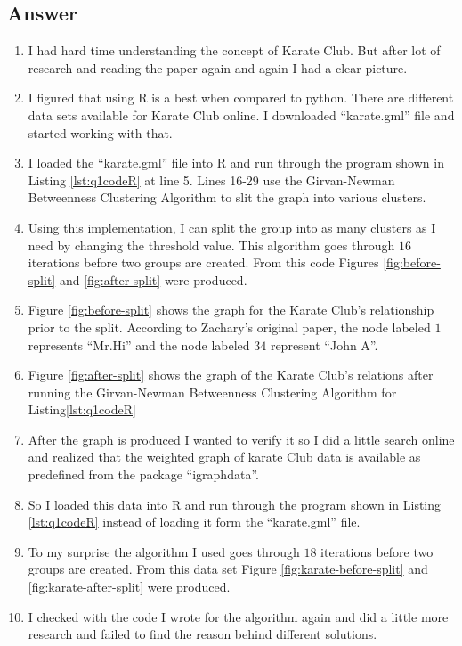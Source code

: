 \subsection*{Answer}
\begin{enumerate}
\item I had hard time understanding the concept of Karate Club. But after lot of research and reading the paper again and again I had a clear picture.
\item I figured that using R is a best when compared to python. There are different data sets available for Karate Club online. I downloaded ``karate.gml'' file and started working with that.
\item I loaded the ``karate.gml'' file into R and run through the program shown in Listing \ref{lst:q1codeR} at line 5. Lines 16-29 use the Girvan-Newman Betweenness Clustering Algorithm to slit the graph into various clusters. 
\item Using this implementation, I can split the group into as many clusters as I need by changing the threshold value. This algorithm goes through $16$ iterations before two groups are created. From this code Figures \ref{fig:before-split} and \ref{fig:after-split} were produced. 
\item Figure \ref{fig:before-split} shows the graph for the Karate Club's relationship prior to the split. According to Zachary's original paper, the node labeled $1$ represents ``Mr.Hi'' and the node labeled $34$ represent ``John A''. 
\item Figure \ref{fig:after-split} shows the graph of the Karate Club's relations after running the Girvan-Newman Betweenness Clustering Algorithm for Listing\ref{lst:q1codeR}
\item After the graph is produced I wanted to verify it so I did a little search online and realized that the weighted graph of karate Club data is available as predefined from the package ``igraphdata''. 
\item So I loaded this data into R and run through the program shown in Listing \ref{lst:q1codeR} instead of loading it form the ``karate.gml'' file. 
\item To my surprise the algorithm I used goes through $18$ iterations before two groups are created. From this data set Figure \ref{fig:karate-before-split} and \ref{fig:karate-after-split} were produced.
\item I checked with the code I wrote for the algorithm again and did a little more research and failed to find the reason behind different solutions. 

\end{enumerate}
